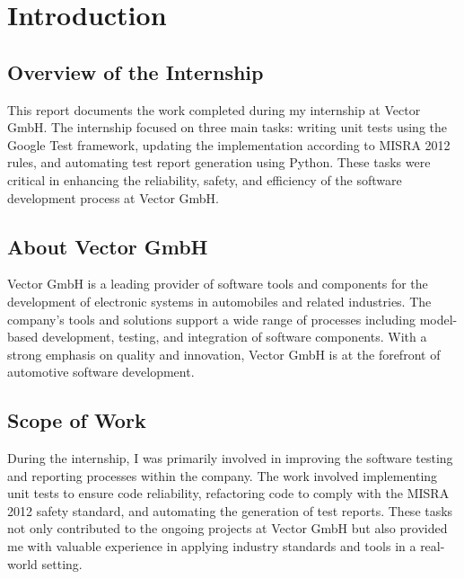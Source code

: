 \chapter{Introduction}

\section{Overview of the Internship}
This report documents the work completed during my internship at Vector GmbH. The internship focused on three main tasks: writing unit tests using the Google Test framework, updating the implementation according to MISRA 2012 rules, and automating test report generation using Python. These tasks were critical in enhancing the reliability, safety, and efficiency of the software development process at Vector GmbH.

\section{About Vector GmbH}
Vector GmbH is a leading provider of software tools and components for the development of electronic systems in automobiles and related industries. The company’s tools and solutions support a wide range of processes including model-based development, testing, and integration of software components. With a strong emphasis on quality and innovation, Vector GmbH is at the forefront of automotive software development.

\section{Scope of Work}
During the internship, I was primarily involved in improving the software testing and reporting processes within the company. The work involved implementing unit tests to ensure code reliability, refactoring code to comply with the MISRA 2012 safety standard, and automating the generation of test reports. These tasks not only contributed to the ongoing projects at Vector GmbH but also provided me with valuable experience in applying industry standards and tools in a real-world setting.

